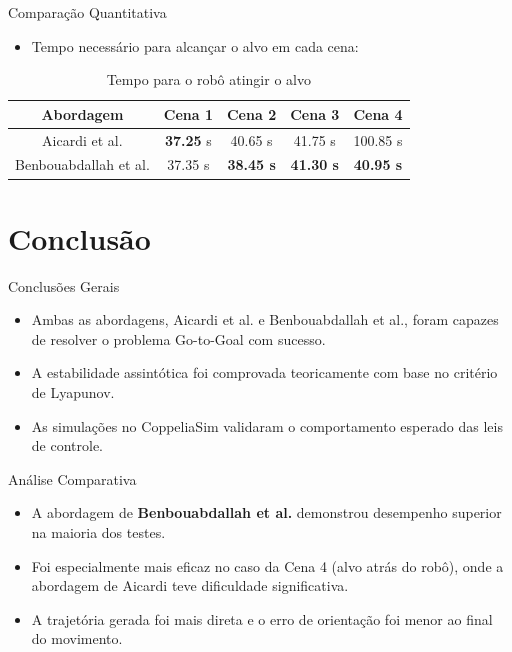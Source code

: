 \documentclass{beamer}
\begin{document}
\begin{frame}{Comparação Quantitativa}
  \begin{itemize}
    \item Tempo necessário para alcançar o alvo em cada cena:
  \end{itemize}

  \begin{table}[]
  \centering
  \scriptsize
  \begin{tabular}{|c|c|c|c|c|}
    \hline
    \textbf{Abordagem} & \textbf{Cena 1} & \textbf{Cena 2} & \textbf{Cena 3} & \textbf{Cena 4} \\
    \hline
    Aicardi et al. &  \textbf{37.25} s & 40.65 s & 41.75 s & 100.85 s \\
    Benbouabdallah et al. & 37.35 s & \textbf{38.45 s} & \textbf{41.30 s} & \textbf{40.95 s} \\
    \hline
  \end{tabular}
  \caption{Tempo para o robô atingir o alvo}
  \end{table}
\end{frame}
\section{Conclusão}

\begin{frame}{Conclusões Gerais}
  \begin{itemize}
    \item Ambas as abordagens, Aicardi et al. e Benbouabdallah et al., foram capazes de resolver o problema Go-to-Goal com sucesso.
    \item A estabilidade assintótica foi comprovada teoricamente com base no critério de Lyapunov.
    \item As simulações no CoppeliaSim validaram o comportamento esperado das leis de controle.
  \end{itemize}
\end{frame}

\begin{frame}{Análise Comparativa}
  \begin{itemize}
    \item A abordagem de \textbf{Benbouabdallah et al.} demonstrou desempenho superior na maioria dos testes.
    \item Foi especialmente mais eficaz no caso da Cena 4 (alvo atrás do robô), onde a abordagem de Aicardi teve dificuldade significativa.
    \item A trajetória gerada foi mais direta e o erro de orientação foi menor ao final do movimento.
  \end{itemize}
\end{frame}
\end{document}
